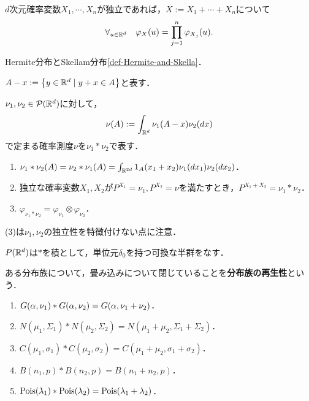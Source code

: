 \documentclass[uplatex,dvipdfmx]{jsreport}
\begin{document}
\begin{corollary}
    $d$次元確率変数$X_1,\cdots,X_n$が独立であれば，$X:=X_1+\cdots+X_n$について
    \[\forall_{u\in\mathbb{R}^d}\quad\varphi_X(u)=\prod^n_{j=1}\varphi_{X_j}(u).\]
\end{corollary}

\begin{example}
    Hermite分布とSkellam分布\ref{def-Hermite-and-Skella}．
\end{example}

\begin{notation}
    $A-x:=\left\{y\in\mathbb{R}^d\mid y+x\in A\right\}$と表す．
\end{notation}

\begin{definition}[convolution]
    $\nu_1,\nu_2\in\mathcal{P}(\mathbb{R}^d)$に対して，
    \[\nu(A):=\int_{\mathbb{R}^d}\nu_1(A-x)\nu_2(dx)\]
    で定まる確率測度$\nu$を$\nu_1*\nu_2$で表す．
\end{definition}

\begin{lemma}\mbox{}
    \begin{enumerate}
        \item $\nu_1*\nu_2(A)=\nu_2*\nu_1(A)=\int_{\mathbb{R}^{2d}}1_A(x_1+x_2)\nu_1(dx_1)\nu_2(dx_2)$．
        \item 独立な確率変数$X_1,X_2$が$P^{X_1}=\nu_1,P^{X_2}=\nu$を満たすとき，$P^{X_1+X_2}=\nu_1*\nu_2$．
        \item $\varphi_{\nu_1*\nu_2}=\varphi_{\nu_1}\otimes\varphi_{\nu_2}$．
    \end{enumerate}
    (3)は$\nu_1,\nu_2$の独立性を特徴付けない点に注意．
\end{lemma}

\begin{lemma}\label{lemma-semigroup-of-distributions}
    $P(\mathbb{R}^d)$は$*$を積として，単位元$\delta_0$を持つ可換な半群をなす．
\end{lemma}

\begin{definition}
    ある分布族について，畳み込みについて閉じていることを\textbf{分布族の再生性}という．
\end{definition}

\begin{example}\mbox{}\label{exp-reproducing-families}
    \begin{enumerate}
        \item $G(\alpha,\nu_1)*G(\alpha,\nu_2)=G(\alpha,\nu_1+\nu_2)$．
        \item $N(\mu_1,\Sigma_1)*N(\mu_2,\Sigma_2)=N(\mu_1+\mu_2,\Sigma_1+\Sigma_2)$．
        \item $C(\mu_1,\sigma_1)*C(\mu_2,\sigma_2)=C(\mu_1+\mu_2,\sigma_1+\sigma_2)$．
        \item $B(n_1,p)*B(n_2,p)=B(n_1+n_2,p)$．
        \item $\mathrm{Pois}(\lambda_1)*\mathrm{Pois}(\lambda_2)=\mathrm{Pois}(\lambda_1+\lambda_2)$．
    \end{enumerate}
\end{example}
\end{document}
